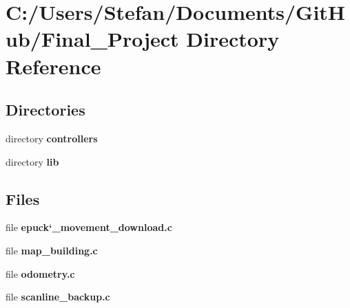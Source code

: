 \section{C\-:/\-Users/\-Stefan/\-Documents/\-Git\-Hub/\-Final\-\_\-\-Project Directory Reference}
\label{dir_7bc185f2187b03eb2cbb1036f8f66b71}
\subsection*{Directories}
\begin{DoxyCompactItemize}
\item 
directory {\bf controllers}
\item 
directory {\bf lib}
\end{DoxyCompactItemize}
\subsection*{Files}
\begin{DoxyCompactItemize}
\item 
file {\bf epuck`\-\_\-movement\-\_\-download.\-c}
\item 
file {\bf map\-\_\-building.\-c}
\item 
file {\bf odometry.\-c}
\item 
file {\bf scanline\-\_\-backup.\-c}
\end{DoxyCompactItemize}
